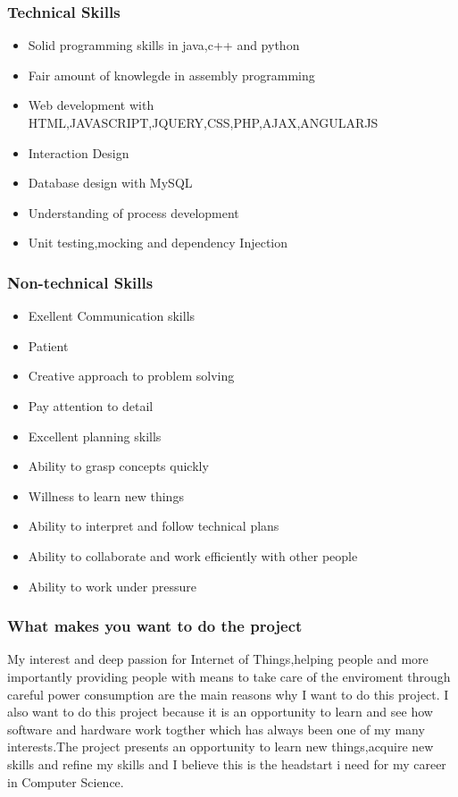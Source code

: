 \documentclass{scrartcl}
\begin{document}
\subsubsection{Technical Skills}
\begin{itemize}
\item Solid programming skills in java,c++ and python
\item Fair amount of knowlegde in assembly programming
\item Web development with HTML,JAVASCRIPT,JQUERY,CSS,PHP,AJAX,ANGULARJS
\item Interaction Design
\item Database design with MySQL
\item Understanding of process development
\item Unit testing,mocking and dependency Injection
\end{itemize}
\subsubsection{Non-technical Skills}
\begin{itemize}
\item Exellent Communication skills
\item Patient
\item Creative approach to problem solving
\item Pay attention to detail
\item Excellent planning skills
\item Ability to grasp concepts quickly
\item Willness to learn new things
\item Ability to interpret and follow technical plans
\item Ability to collaborate and work efficiently with other people
\item Ability to work under pressure
\end{itemize}
\subsubsection{What makes you want to do the project}
\begin{flushleft}
My interest and deep passion for Internet of Things,helping people and more importantly providing people with means to take
care of the enviroment through careful power consumption are the main reasons why I want to do this project. I also want to do
this project because it is an opportunity to learn and see how software and hardware work togther which has always been one of my many interests.The project presents an opportunity to learn new things,acquire new skills and refine my skills and I believe this is the headstart i need for my career in Computer Science.
\end{flushleft}
\end{document}
